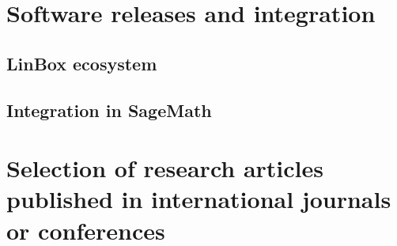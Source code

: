 \documentclass{deliverablereport}
\begin{document}
\section{Software releases and integration}

\subsection{LinBox ecosystem}

\subsection{Integration in SageMath}



\appendix
\section{Selection of research articles published in international journals or conferences}
\label{app:papers}



\end{document}
